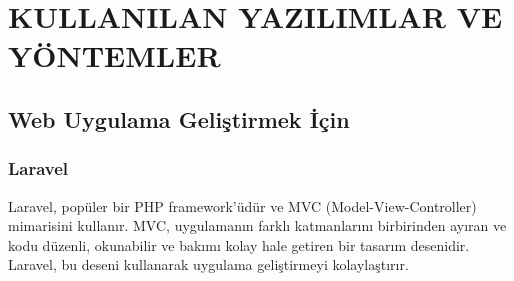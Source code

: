 \section{KULLANILAN YAZILIMLAR VE YÖNTEMLER}

\subsection{Web Uygulama Geliştirmek İçin}
\subsubsection{Laravel }
Laravel, popüler bir PHP framework'üdür ve MVC (Model-View-Controller) mimarisini kullanır. MVC, uygulamanın farklı katmanlarını birbirinden ayıran ve kodu düzenli, okunabilir ve bakımı kolay hale getiren bir tasarım desenidir. Laravel, bu deseni kullanarak uygulama geliştirmeyi kolaylaştırır.

